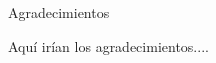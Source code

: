 \newpage
\thispagestyle{empty}
\Huge \bf
\begin{flushleft}
Agradecimientos\end{flushleft} \rm \normalsize
\vspace{1cm}

Aquí irían los agradecimientos....
